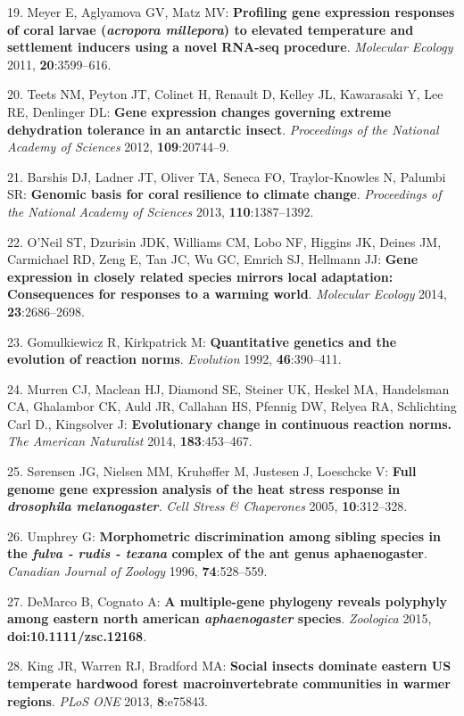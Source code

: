 \documentclass[]{article}
\begin{document}
19. Meyer E, Aglyamova GV, Matz MV: \textbf{Profiling gene expression
responses of coral larvae (\emph{acropora millepora}) to elevated
temperature and settlement inducers using a novel RNA-seq procedure}.
\emph{Molecular Ecology} 2011, \textbf{20}:3599--616.

20. Teets NM, Peyton JT, Colinet H, Renault D, Kelley JL, Kawarasaki Y,
Lee RE, Denlinger DL: \textbf{Gene expression changes governing extreme
dehydration tolerance in an antarctic insect}. \emph{Proceedings of the
National Academy of Sciences} 2012, \textbf{109}:20744--9.

21. Barshis DJ, Ladner JT, Oliver TA, Seneca FO, Traylor-Knowles N,
Palumbi SR: \textbf{Genomic basis for coral resilience to climate
change}. \emph{Proceedings of the National Academy of Sciences} 2013,
\textbf{110}:1387--1392.

22. O'Neil ST, Dzurisin JDK, Williams CM, Lobo NF, Higgins JK, Deines
JM, Carmichael RD, Zeng E, Tan JC, Wu GC, Emrich SJ, Hellmann JJ:
\textbf{Gene expression in closely related species mirrors local
adaptation: Consequences for responses to a warming world}.
\emph{Molecular Ecology} 2014, \textbf{23}:2686--2698.

23. Gomulkiewicz R, Kirkpatrick M: \textbf{Quantitative genetics and the
evolution of reaction norms}. \emph{Evolution} 1992,
\textbf{46}:390--411.

24. Murren CJ, Maclean HJ, Diamond SE, Steiner UK, Heskel MA, Handelsman
CA, Ghalambor CK, Auld JR, Callahan HS, Pfennig DW, Relyea RA,
Schlichting Carl D., Kingsolver J: \textbf{Evolutionary change in
continuous reaction norms.} \emph{The American Naturalist} 2014,
\textbf{183}:453--467.

25. S{ø}rensen JG, Nielsen MM, Kruh{ø}ffer M, Justesen J, Loeschcke V:
\textbf{Full genome gene expression analysis of the heat stress response
in \emph{drosophila melanogaster}}. \emph{Cell Stress \& Chaperones}
2005, \textbf{10}:312--328.

26. Umphrey G: \textbf{Morphometric discrimination among sibling species
in the \emph{fulva - rudis - texana} complex of the ant genus
aphaenogaster}. \emph{Canadian Journal of Zoology} 1996,
\textbf{74}:528--559.

27. DeMarco B, Cognato A: \textbf{A multiple-gene phylogeny reveals
polyphyly among eastern north american \emph{aphaenogaster} species}.
\emph{Zoologica} 2015, \textbf{doi:10.1111/zsc.12168}.

28. King JR, Warren RJ, Bradford MA: \textbf{Social insects dominate
eastern US temperate hardwood forest macroinvertebrate communities in
warmer regions}. \emph{PLoS ONE} 2013, \textbf{8}:e75843.
\end{document}

